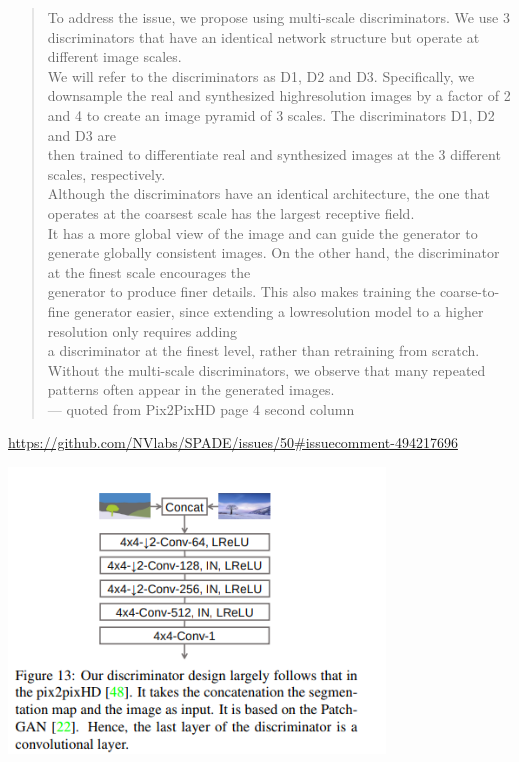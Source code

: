 \documentclass[a4paper, dvipdfmx, 10pt]{article}
\begin{document}
\begin{quote}
To address the issue, we propose using multi-scale discriminators. We use 3 discriminators that have an identical network structure but operate at different image scales.\\
We will refer to the discriminators as D1, D2 and D3. Specifically, we downsample the real and synthesized highresolution images by a factor of 2 and 4 to create an image pyramid of 3 scales. The discriminators D1, D2 and D3 are\\
then trained to differentiate real and synthesized images at the 3 different scales, respectively.\\
Although the discriminators have an identical architecture, the one that operates at the coarsest scale has the largest receptive field.\\
It has a more global view of the image and can guide the generator to generate globally consistent images. On the other hand, the discriminator at the finest scale encourages the\\
generator to produce finer details. This also makes training the coarse-to-fine generator easier, since extending a lowresolution model to a higher resolution only requires adding\\
a discriminator at the finest level, rather than retraining from scratch.\\
Without the multi-scale discriminators, we observe that many repeated patterns often appear in the generated images.\\

--- quoted from Pix2PixHD page 4 second column\\
\end{quote}
\url{https://github.com/NVlabs/SPADE/issues/50\#issuecomment-494217696}\\
\begin{center}
\includegraphics[width=10cm]{./gaugan_disc.png}
\end{center}
\end{document}
